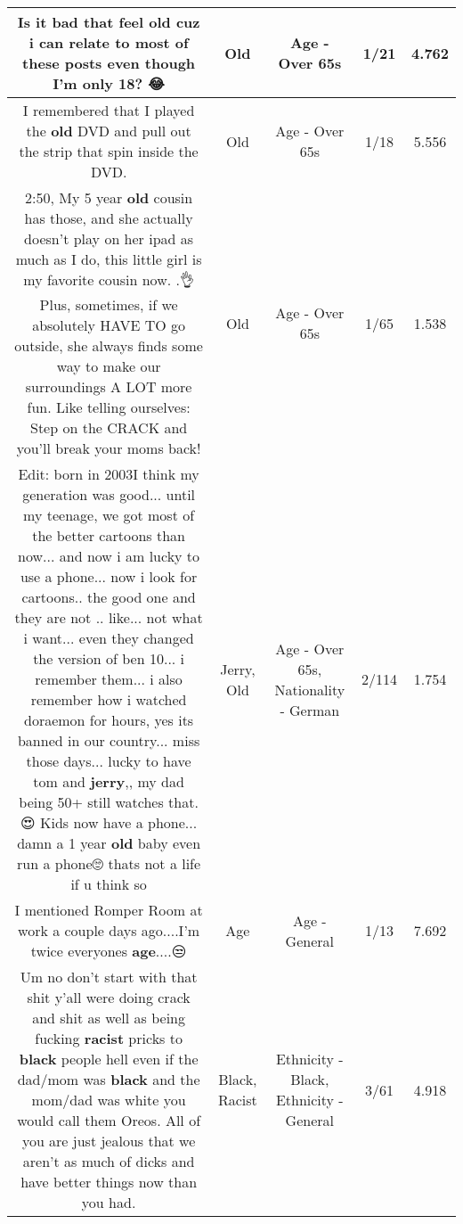 \documentclass[11pt]{article}
\newlength\mylength
\begin{document}
\begin{center}
\begin{longtable}{|C{.65\mylength}|C{.30\mylength}|C{.12\mylength}|C{.12\mylength}|C{.12\mylength}|}
  \small Is it bad that feel \textbf{old} cuz i can relate to most of these posts even though I'm only 18? 😂\normalsize   & Old & Age - Over 65s & 1/21 & 4.762 \\  \hline
  \small I remembered that I played the \textbf{old} DVD and pull out the strip that spin inside the DVD.\normalsize   & Old & Age - Over 65s & 1/18 & 5.556 \\  \hline
  \small 2:50, My 5 year \textbf{old} cousin has those, and she actually doesn't play on her ipad as much as I do, this little girl is my favorite cousin now. .👌 Plus, sometimes, if we absolutely HAVE TO go outside, she always finds some way to make our surroundings A LOT more fun. Like telling ourselves: Step on the CRACK and you'll break your moms back!\normalsize   & Old & Age - Over 65s & 1/65 & 1.538 \\  \hline
  \small Edit: born in 2003I think my generation was good... until my teenage, we got  most of the better cartoons than now... and now i am lucky to use a phone... now i look for cartoons.. the good one and they are not .. like... not what i want... even they changed the version of ben 10... i remember them... i also remember how i watched doraemon for hours, yes its banned in our country... miss those days... lucky to have tom and \textbf{jerry},, my dad being 50+ still watches that.😍 Kids now have a phone... damn a 1 year \textbf{old} baby even run a phone🙄 thats not a life if u think so\normalsize   & Jerry, Old & Age - Over 65s, Nationality - German & 2/114 & 1.754 \\  \hline
  \small I mentioned Romper Room at work a couple days ago....I'm twice everyones \textbf{age}....😒\normalsize   & Age & Age - General & 1/13 & 7.692 \\  \hline
  \small Um no don't start with that shit y'all were doing crack and shit as well as being fucking \textbf{racist} pricks to \textbf{black} people hell even if the dad/mom was \textbf{black} and the mom/dad was white you would call them Oreos. All of you are just jealous that we aren't as much of dicks and have better things now than you had.\normalsize   & Black, Racist & Ethnicity - Black, Ethnicity - General & 3/61 & 4.918 \\  \hline

\end{longtable}
\end{center}
\end{document}
